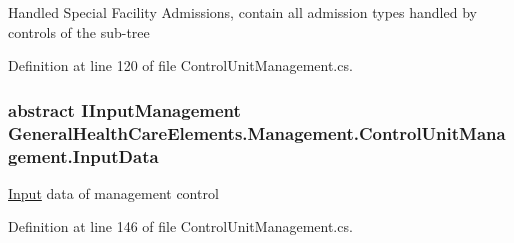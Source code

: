 Handled Special Facility Admissions, contain all admission types handled by controls of the sub-\/tree 



Definition at line 120 of file Control\+Unit\+Management.\+cs.

\subsubsection[{\texorpdfstring{Input\+Data}{InputData}}]{\setlength{\rightskip}{0pt plus 5cm}abstract {\bf I\+Input\+Management} General\+Health\+Care\+Elements.\+Management.\+Control\+Unit\+Management.\+Input\+Data\hspace{0.3cm}{\ttfamily [get]}}\hypertarget{class_general_health_care_elements_1_1_management_1_1_control_unit_management_aa2446a085b9cbd04632a0ff27434708e}{}\label{class_general_health_care_elements_1_1_management_1_1_control_unit_management_aa2446a085b9cbd04632a0ff27434708e}


\hyperlink{namespace_general_health_care_elements_1_1_input}{Input} data of management control 



Definition at line 146 of file Control\+Unit\+Management.\+cs.

